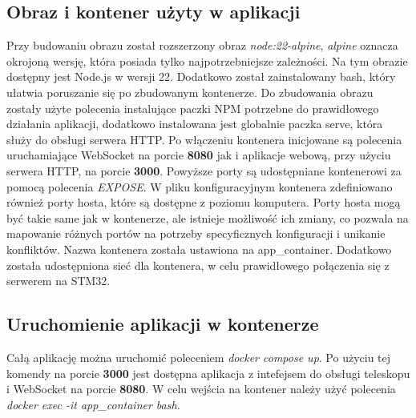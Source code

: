 \subsection{Obraz i kontener użyty w aplikacji}
Przy budowaniu obrazu został rozszerzony obraz \textit{node:22-alpine}, \textit{alpine} oznacza okrojoną wersję, która posiada tylko najpotrzebniejsze zależności. Na tym obrazie dostępny jest Node.js w wersji 22. Dodatkowo został zainstalowany bash, który ułatwia poruszanie się po zbudowanym kontenerze. Do zbudowania obrazu zostały użyte polecenia instalujące paczki NPM potrzebne do prawidłowego działania aplikacji, dodatkowo instalowana jest globalnie paczka serve, która służy do obsługi serwera HTTP. Po włączeniu kontenera inicjowane są polecenia uruchamiające WebSocket na porcie \textbf{8080} jak i aplikacje webową, przy użyciu serwera HTTP, na porcie \textbf{3000}. Powyższe porty są udostępniane kontenerowi za pomocą polecenia \textit{EXPOSE}. W pliku konfiguracyjnym kontenera zdefiniowano również porty hosta, które są dostępne z poziomu komputera. Porty hosta mogą być takie same jak w kontenerze, ale istnieje możliwość ich zmiany, co pozwala na mapowanie różnych portów na potrzeby specyficznych konfiguracji i unikanie konfliktów. Nazwa kontenera została ustawiona na app\_container. Dodatkowo została udostępniona sieć dla kontenera, w celu prawidłowego połączenia się z serwerem na STM32.
\subsection{Uruchomienie aplikacji w kontenerze}
Całą aplikację można uruchomić poleceniem \textit{docker compose up}. Po użyciu tej komendy na porcie \textbf{3000} jest dostępna aplikacja z intefejsem do obsługi teleskopu i WebSocket na porcie \textbf{8080}. W celu wejścia na kontener należy użyć polecenia \textit{docker exec -it app\_container bash}.